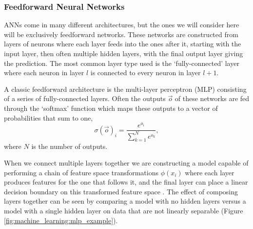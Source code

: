 \subsubsection{Feedforward Neural Networks}
ANNs come in many different architectures, but the ones we will consider here will be exclusively feedforward networks. 
These networks are constructed from layers of neurons where each layer feeds into the ones after it, starting with the input layer, then often multiple hidden layers, with the final output layer giving the prediction. 
The most common layer type used is the `fully-connected' layer where each neuron in layer $l$ is connected to every neuron in layer $l+1$. 

A classic feedforward architecture is the multi-layer perceptron (MLP) consisting of a series of fully-connected layers. Often the outputs $\vec{o}$ of these networks are fed through the `softmax' function which maps these outputs to a vector of probabilities that sum to one,
\begin{equation}
    \sigma(\vec{o})_{i} = \frac{e^{o_{i}}}{\sum_{k=1}^{N}e^{o_{k}}},
\end{equation}
where $N$ is the number of outputs. 

When we connect multiple layers together we are constructing a model capable of performing a chain of feature space transformations $\phi(x_{i})$ where each layer produces features for the one that follows it, and the final layer can place a linear decision boundary on this transformed feature space \cite{DeepLearningBook}. 
The effect of composing layers together can be seen by comparing a model with no hidden layers versus a model with a single hidden layer on data that are not linearly separable (Figure \ref{fig:machine_learning:mlp_example}).

